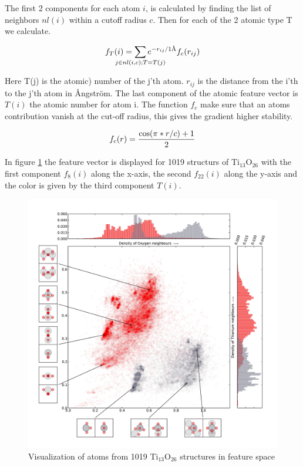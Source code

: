 \documentclass[%
 aps,
 prl,%
 amsmath,amssymb,
 reprint,%
]{revtex4-1}
\begin{document}
The first 2 components for each atom $i$, is calculated by finding the list of neighbors $nl(i)$ within a cutoff radius $c$. Then for each of the 2 atomic type T we calculate. 

\begin{equation}
f_T(i) = \sum_{\mathclap{j \in nl(i,c);T=T(j)}} e^{-r_{ij}/1\text{\AA}}f_c(r_{ij})  \label{eq1}
\end{equation}

Here T(j) is the atomic) number of the j'th atom. $r_{ij}$ is the distance from the i'th to the j'th atom in {\AA}ngstr\"{o}m. The last component of the atomic feature vector is $T(i)$ the atomic number for atom i. 
The function $f_c$ make sure that an atoms contribution vanish at the cut-off radius, this gives the gradient higher stability.

\begin{equation}
f_c(r)={{\cos(\pi*r/c)+1}\over 2}
\end{equation}



In figure \ref{fig:fig1} the feature vector is displayed for 1019 structurs of Ti$_{13}$O$_{26}$ with the first component $f_8(i)$ along the x-axis, the second $f_{22}(i)$ along the y-axis and the color is given by the third component $T(i)$. 


\begin{figure}[h]
    \centering
    \includegraphics[width=1.0\columnwidth]{fig1-scatterplot.pdf}
    \caption{Visualization of atoms from 1019 Ti$_{13}$O$_{26}$ structures in feature space}
    \label{fig:fig1}
\end{figure}
\end{document}
